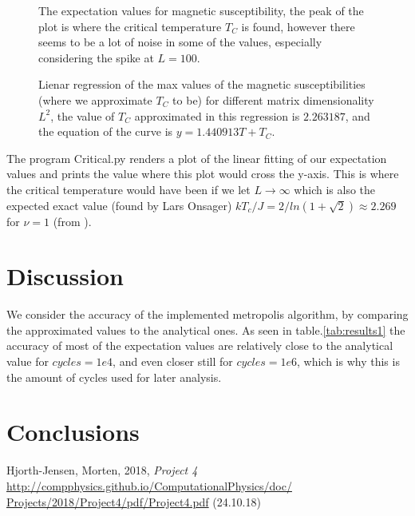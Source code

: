 \documentclass{emulateapj}
\begin{document}
%
%
\begin{figure}[H]

\mbox{}

\caption{The expectation values for magnetic susceptibility, the peak of the plot is where the critical temperature $T_C$ is found, however there seems to be a lot of noise in some of the values, especially considering the spike at $L=100$.}
\label{fig:SMean2}
\end{figure}
%
%
\begin{figure}[H]

\mbox{}

\caption{Lienar regression of the max values of the magnetic susceptibilities (where we approximate $T_C$ to be) for different matrix dimensionality $L^2$, the value of $T_C$ approximated in this regression is $2.263187$, and the equation of the curve is $y = 1.440913T + T_C$.}
\label{fig:LinearFitting}
\end{figure}
%
The program Critical.py renders a plot of the linear fitting of our expectation values and prints the value where this plot would cross the y-axis. This is where the critical temperature would have been if we let $L \rightarrow \infty$ which is also the expected exact value (found by Lars Onsager) $kT_{c}/J = 2/ln(1+\sqrt{2}) \approx 2.269$ for $\nu = 1$ (from \cite{bib:project4}).

\section{Discussion}
\label{sec:discussion}
We consider the accuracy of the implemented metropolis algorithm, by comparing the approximated values to the analytical ones. As seen in table.\ref{tab:results1} the accuracy of most of the expectation values are relatively close to the analytical value for $cycles = 1e4$, and even closer still for $cycles = 1e6$, which is why this is the amount of cycles used for later analysis.

\section{Conclusions}
\label{sec:conclusions}



\begin{acknowledgements}

\end{acknowledgements}

\begin{thebibliography}{}
 Hjorth-Jensen, Morten, 2018, \textit{Project 4} \url{http://compphysics.github.io/ComputationalPhysics/doc/
Projects/2018/Project4/pdf/Project4.pdf} (24.10.18)

\bibitem{}
\end{thebibliography}
\end{document}
